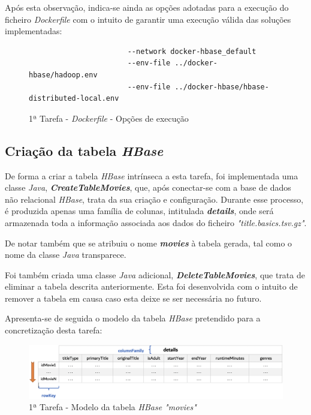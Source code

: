 \documentclass[a4paper]{report}
\begin{document}
{        Após esta observação, indica-se ainda as opções adotadas para a execução do ficheiro \textit{Dockerfile} com o intuito de garantir uma execução válida das soluções implementadas:
		\begin{figure}[H]
			{
				\color{teal}
				\begin{verbatim}
					   --network docker-hbase_default
					   --env-file ../docker-hbase/hadoop.env
					   --env-file ../docker-hbase/hbase-distributed-local.env
				\end{verbatim}
			}
			\caption{1ª Tarefa - \textit{Dockerfile} - Opções de execução}
			\label{fig:4}
        \end{figure}
		
		\subsection{Criação da tabela \textit{HBase}} \label{subsec:Task1-1}
		De forma a criar a tabela \textit{HBase} intrínseca a esta tarefa, foi implementada uma classe \textit{Java}, \textbf{\textit{CreateTableMovies}}, que, após conectar-se com a base de dados não relacional \textit{HBase}, trata da sua criação e configuração.
		Durante esse processo, é produzida apenas uma família de colunas, intitulada \textbf{\textit{details}}, onde será armazenada toda a informação associada aos dados do ficheiro \textit{"title.basics.tsv.gz"}.

		De notar também que se atribuiu o nome \textbf{\textit{movies}} à tabela gerada, tal como o nome da classe \textit{Java} transparece.

		Foi também criada uma classe \textit{Java} adicional, \textbf{\textit{DeleteTableMovies}}, que trata de eliminar a tabela descrita anteriormente.
		Esta foi desenvolvida com o intuito de remover a tabela em causa caso esta deixe se ser necessária no futuro.
        
        Apresenta-se de seguida o modelo da tabela \textit{HBase} pretendido para a concretização desta tarefa:
        \begin{figure}[H]
            \centering
            \includegraphics[width=1.0\textwidth]{Imagens/1ª Tarefa - Tabela Hbase.png}
            \caption{1ª Tarefa - Modelo da tabela \textit{HBase "movies"}}
            \label{fig:5}
        \end{figure}

}
\end{document}

